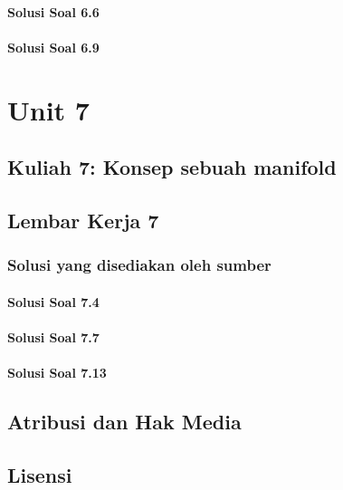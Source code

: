 \documentclass[11pt,a4paper,oneside]{book}
\begin{document}
\subsection*{Solusi Soal 6.6}

\subsection*{Solusi Soal 6.9}


\part{Unit 7}
\chapter[Kuliah 7]{Kuliah 7: Konsep sebuah manifold}


\chapter{Lembar Kerja 7}


\section*{Solusi yang disediakan oleh sumber}
\subsection*{Solusi Soal 7.4}

\subsection*{Solusi Soal 7.7}

\subsection*{Solusi Soal 7.13}


\backmatter
\listoffigures
\chapter*{Atribusi dan Hak Media}







\chapter*{Lisensi}
\Lizenztext
\end{document}

